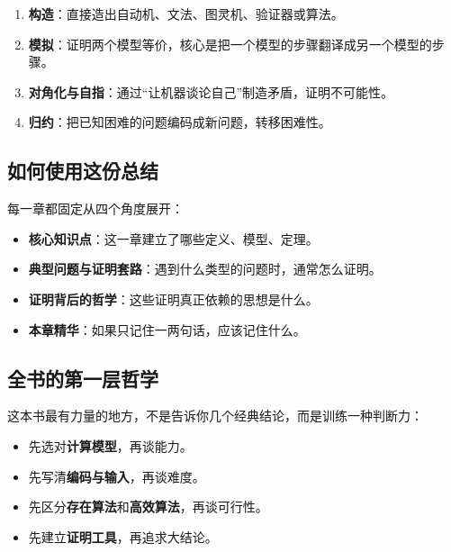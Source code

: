 \begin{enumerate}[leftmargin=2em]
  \item \textbf{构造}：直接造出自动机、文法、图灵机、验证器或算法。
  \item \textbf{模拟}：证明两个模型等价，核心是把一个模型的步骤翻译成另一个模型的步骤。
  \item \textbf{对角化与自指}：通过“让机器谈论自己”制造矛盾，证明不可能性。
  \item \textbf{归约}：把已知困难的问题编码成新问题，转移困难性。
\end{enumerate}

\subsection{如何使用这份总结}

每一章都固定从四个角度展开：
\begin{itemize}[leftmargin=2em]
  \item \textbf{核心知识点}：这一章建立了哪些定义、模型、定理。
  \item \textbf{典型问题与证明套路}：遇到什么类型的问题时，通常怎么证明。
  \item \textbf{证明背后的哲学}：这些证明真正依赖的思想是什么。
  \item \textbf{本章精华}：如果只记住一两句话，应该记住什么。
\end{itemize}

\subsection{全书的第一层哲学}

这本书最有力量的地方，不是告诉你几个经典结论，而是训练一种判断力：
\begin{itemize}[leftmargin=2em]
  \item 先选对\textbf{计算模型}，再谈能力。
  \item 先写清\textbf{编码与输入}，再谈难度。
  \item 先区分\textbf{存在算法}和\textbf{高效算法}，再谈可行性。
  \item 先建立\textbf{证明工具}，再追求大结论。
\end{itemize}

\newpage
